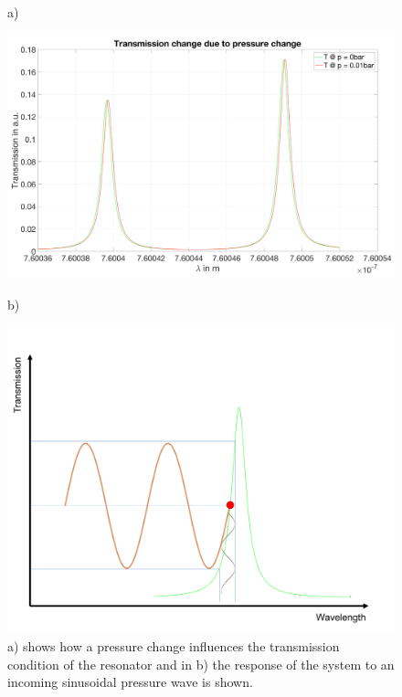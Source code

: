 \begin{figure}[H]
	a)
	\begin{minipage}{0.5\textwidth}
		
		\includegraphics[width = \textwidth, height=0.3\textheight]{05_OUSD/images/transmissionChangePressure.png}
	\end{minipage}
	b)
	\begin{minipage}{0.5\textwidth}
		
		\includegraphics[width = \textwidth, height=0.35\textheight]{05_OUSD/images/sigSchematic.jpg}
	\end{minipage}
	
	\caption{a) shows how a pressure change influences the transmission condition of the resonator and in b) the response of the system to an incoming sinusoidal pressure wave is shown.}
	\label{fig:transmissionChange}
\end{figure}
 
